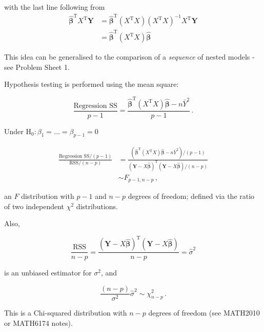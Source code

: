\documentclass[
]{book}
\theoremstyle{definition}
\theoremstyle{definition}
\theoremstyle{definition}
\theoremstyle{definition}
\theoremstyle{remark}
\begin{document}
with the last line following from
\begin{align*}
\hat{\boldsymbol{\beta}}^{\textrm{T}}X^{\textrm{T}}\boldsymbol{Y} & =
\hat{\boldsymbol{\beta}}^{\textrm{T}}(X^{\textrm{T}}X)(X^{\textrm{T}}X)^{-1}X^{\textrm{T}}\boldsymbol{Y} \\
& = \hat{\boldsymbol{\beta}}^{\textrm{T}}(X^{\textrm{T}}X)\hat{\boldsymbol{\beta}}
\end{align*}

This idea can be generalised to the comparison of a \emph{sequence} of nested models - see Problem Sheet 1.

Hypothesis testing is performed using the mean square:

\begin{equation}
\frac{\textrm{Regression SS}}{p-1}=\frac{\hat{\boldsymbol{\beta}}^{\textrm{T}}(X^{\textrm{T}}X)\hat{\boldsymbol{\beta}}-n\bar{Y}^{2}}{p-1}\,.\nonumber
\end{equation}

Under \(\textrm{H}_{0}: \beta_{1}=\dots=\beta_{p-1}=0\)

\begin{align*}
\frac{\textrm{Regression SS}/(p-1)}{\textrm{RSS}/(n-p)} & = \frac{(\hat{\boldsymbol{\beta}}^{\textrm{T}}(X^{\textrm{T}}X)\hat{\boldsymbol{\beta}} - n\bar{Y}^{2})/(p-1)}{(\boldsymbol{Y}-X\hat{\boldsymbol{\beta}})^{\textrm{T}}(\boldsymbol{Y}-X\hat{\boldsymbol{\beta}})/(n-p)}\nonumber\\
& \sim F_{p-1,n-p}\,,
\end{align*}

an \(F\) distribution with \(p-1\) and \(n-p\) degrees of freedom; defined via the ratio of two independent \(\chi^{2}\) distributions.

Also,

\begin{equation*}
\frac{\textrm{RSS}}{n-p}=\frac{(\boldsymbol{Y}-X\hat{\boldsymbol{\beta}})^{\textrm{T}}(\boldsymbol{Y}-X\hat{\boldsymbol{\beta}})}{n-p}=\hat{\sigma}^{2}
\end{equation*}

is an unbiased estimator for \(\sigma^{2}\), and

\begin{equation*}
\frac{(n-p)}{\sigma^{2}}\hat{\sigma}^{2}\sim\chi^{2}_{n-p}\,.
\end{equation*}

This is a Chi-squared distribution with \(n-p\) degrees of freedom (see MATH2010 or MATH6174 notes).
\end{document}
